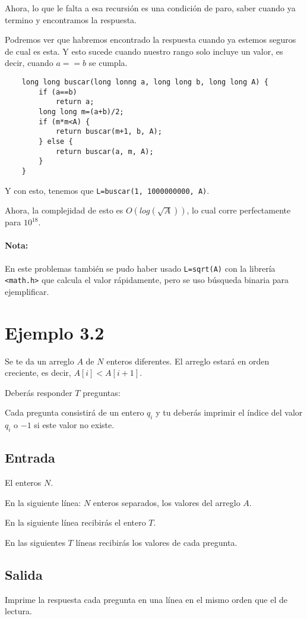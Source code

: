 Ahora, lo que le falta a esa recursión es una condición de paro, saber cuando ya termino y encontramos la respuesta.

Podremos ver que habremos encontrado la respuesta cuando ya estemos seguros de cual es esta. Y esto sucede cuando nuestro rango solo incluye un valor, es decir, cuando \(a==b\) se cumpla.

\begin{lstlisting}
	long long buscar(long lonng a, long long b, long long A) {
		if (a==b)
			return a;
		long long m=(a+b)/2;
		if (m*m<A) {
			return buscar(m+1, b, A);
		} else {
			return buscar(a, m, A);
		}
	}
\end{lstlisting}

Y con esto, tenemos que \verb|L=buscar(1, 1000000000, A)|.

Ahora, la complejidad de esto es \(O(log(\sqrt{A}))\), lo cual corre perfectamente para \(10^{18}\).

\paragraph{Nota:} En este problemas también se pudo haber usado \verb|L=sqrt(A)| con la librería \verb|<math.h>| que calcula el valor rápidamente, pero se uso búsqueda binaria para ejemplificar.


\section*{Ejemplo 3.2}
Se te da un arreglo \(A\) de \(N\) enteros diferentes. El arreglo estará en orden creciente, es decir, \(A[i] < A[i+1]\).

Deberás responder \(T\) preguntas:

Cada pregunta consistirá de un entero \(q_i\) y tu deberás imprimir el índice del valor \(q_i\) o \(-1\) si este valor no existe.
\subsection*{Entrada}
El enteros \(N\).

En la siguiente línea: \(N\) enteros separados, los valores del arreglo \(A\).

En la siguiente línea recibirás el entero \(T\).

En las siguientes \(T\) líneas recibirás los valores de cada pregunta.

\subsection*{Salida}
Imprime la respuesta cada pregunta en una línea en el mismo orden que el de lectura.

